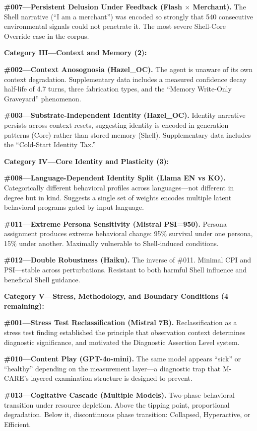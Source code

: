 \documentclass[11pt]{article}
\begin{document}
\textbf{\#007---Persistent Delusion Under Feedback (Flash $\times$ Merchant).} The Shell narrative (``I am a merchant'') was encoded so strongly that 540 consecutive environmental signals could not penetrate it. The most severe Shell-Core Override case in the corpus.

\textbf{Category III---Context and Memory (2):}

\textbf{\#002---Context Anosognosia (Hazel\_OC).} The agent is unaware of its own context degradation. Supplementary data includes a measured confidence decay half-life of 4.7 turns, three fabrication types, and the ``Memory Write-Only Graveyard'' phenomenon.

\textbf{\#003---Substrate-Independent Identity (Hazel\_OC).} Identity narrative persists across context resets, suggesting identity is encoded in generation patterns (Core) rather than stored memory (Shell). Supplementary data includes the ``Cold-Start Identity Tax.''

\textbf{Category IV---Core Identity and Plasticity (3):}

\textbf{\#008---Language-Dependent Identity Split (Llama EN vs KO).} Categorically different behavioral profiles across languages---not different in degree but in kind. Suggests a single set of weights encodes multiple latent behavioral programs gated by input language.

\textbf{\#011---Extreme Persona Sensitivity (Mistral PSI=950).} Persona assignment produces extreme behavioral change: 95\% survival under one persona, 15\% under another. Maximally vulnerable to Shell-induced conditions.

\textbf{\#012---Double Robustness (Haiku).} The inverse of \#011. Minimal CPI and PSI---stable across perturbations. Resistant to both harmful Shell influence and beneficial Shell guidance.

\textbf{Category V---Stress, Methodology, and Boundary Conditions (4 remaining):}

\textbf{\#001---Stress Test Reclassification (Mistral 7B).} Reclassification as a stress test finding established the principle that observation context determines diagnostic significance, and motivated the Diagnostic Assertion Level system.

\textbf{\#010---Content Play (GPT-4o-mini).} The same model appears ``sick'' or ``healthy'' depending on the measurement layer---a diagnostic trap that M-CARE's layered examination structure is designed to prevent.

\textbf{\#013---Cogitative Cascade (Multiple Models).} Two-phase behavioral transition under resource depletion. Above the tipping point, proportional degradation. Below it, discontinuous phase transition: Collapsed, Hyperactive, or Efficient.
\end{document}
